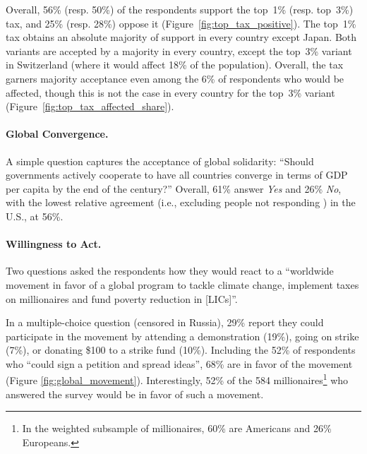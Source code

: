 \documentclass[12pt,english]{article}
\begin{document}
Overall, 56\% (resp. 50\%) of the respondents support the top~1\% (resp. top~3\%) tax, and 25\% (resp. 28\%) oppose it (Figure~\ref{fig:top_tax_positive}). 
The top~1\% tax obtains an absolute majority of support in every country except Japan. 
Both variants are accepted by a majority in every country, except the top~3\% variant in Switzerland (where it would affect 18\% of the population). 
Overall, the tax garners %
majority acceptance 
even among the 6\% of respondents who would be affected, though this is not the case in every country for the top~3\% variant (Figure~\ref{fig:top_tax_affected_share}). 

\paragraph{Global Convergence.}\label{par:convergence}

A simple question captures the acceptance of global solidarity: ``Should governments actively cooperate to have all countries converge in terms of GDP per capita by the end of the century?'' Overall, 61\% answer \textit{Yes} and 26\% \textit{No}, with the lowest relative agreement (i.e., excluding people not responding%
) in the U.S., at 56\%.

\paragraph{Willingness to Act.}\label{par:willingness_act}

Two questions asked the respondents how they would react to a ``worldwide movement in favor of a global program to tackle climate change, implement taxes on millionaires and fund poverty reduction in [LICs]''. 

In a multiple-choice question (censored in Russia), 29\% report they could participate in the movement by attending a demonstration (19\%), going on strike (7\%), or donating \$100 to a strike fund (10\%). Including the 52\% of respondents who ``could sign a petition and spread ideas'', 68\% are in favor of the movement (Figure \ref{fig:global_movement}). 
Interestingly, 52\% of the 584 millionaires\footnote{In the weighted subsample of millionaires, 60\% are Americans and 26\% Europeans.} who answered the survey would be in favor of such a movement.
\end{document}
